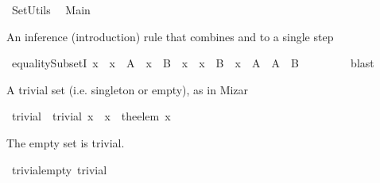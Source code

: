 %
\begin{isabellebody}%
\def\isabellecontext{SetUtils}%
%
\isamarkuptrue%
%
\isadelimtheory
%
\endisadelimtheory
%
\isatagtheory
{}\isamarkupfalse%
\ SetUtils\isanewline
{}\isanewline
\ \ Main\isanewline
\isanewline
{}%
\endisatagtheory
{\isafoldtheory}%
%
\isadelimtheory
%
\endisadelimtheory
%
\isamarkuptrue%
%
\begin{isamarkuptext}%
An inference (introduction) rule that combines  and  to a single step%
\end{isamarkuptext}%
\isamarkuptrue%
\isamarkupfalse%
\ equalitySubsetI{\isacharcolon}\ {\isachardoublequoteopen}{\isacharparenleft}{\isasymAnd}x\ {\isachardot}\ x\ {\isasymin}\ A\ {\isasymLongrightarrow}\ x\ {\isasymin}\ B{\isacharparenright}\ {\isasymLongrightarrow}\ {\isacharparenleft}{\isasymAnd}x\ {\isachardot}\ x\ {\isasymin}\ B\ {\isasymLongrightarrow}\ x\ {\isasymin}\ A{\isacharparenright}\ {\isasymLongrightarrow}\ A\ {\isacharequal}\ B{\isachardoublequoteclose}\ \isanewline
%
\isadelimproof
\ \ \ \ \ \ %
\endisadelimproof
%
\isatagproof
{}\isamarkupfalse%
\ blast%
\endisatagproof
{\isafoldproof}%
%
\isadelimproof
%
\endisadelimproof
%
\isamarkuptrue%
%
\begin{isamarkuptext}%
A trivial set (i.e. singleton or empty), as in Mizar%
\end{isamarkuptext}%
\isamarkuptrue%
\isamarkupfalse%
\ trivial\ \ {\isachardoublequoteopen}trivial\ x\ {\isacharequal}\ {\isacharparenleft}x\ {\isasymsubseteq}\ {\isacharbraceleft}the{\isacharunderscore}elem\ x{\isacharbraceright}{\isacharparenright}{\isachardoublequoteclose}%
\begin{isamarkuptext}%
The empty set is trivial.%
\end{isamarkuptext}%
\isamarkuptrue%
\isamarkupfalse%
\ trivial{\isacharunderscore}empty{\isacharcolon}\ {\isachardoublequoteopen}trivial\ {\isacharbraceleft}{\isacharbraceright}{\isachardoublequoteclose}\ \isanewline

\end{isabellebody}
